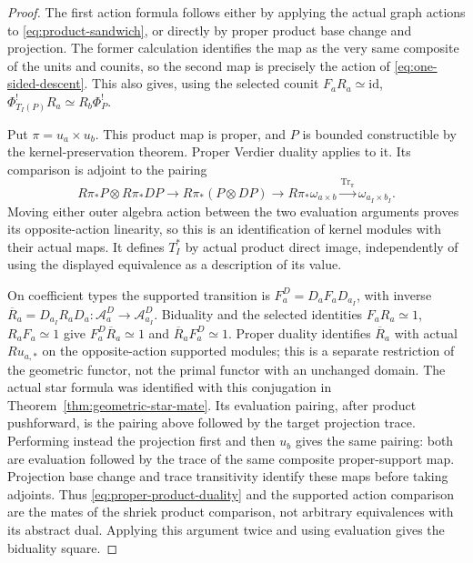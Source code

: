 \documentclass[11pt]{article}
\theoremstyle{definition}
\theoremstyle{remark}
\begin{document}
\begin{proof}
The first action formula follows either by applying the actual graph
actions to \eqref{eq:product-sandwich}, or directly by proper product
base change and projection.  The former calculation identifies the
map as the very same composite of the units and counits, so the second
map is precisely the action of \eqref{eq:one-sided-descent}.
This also gives, using the selected counit $F_aR_a\simeq\mathrm{id}$,
$\Phi_{T_I(P)}^!R_a\simeq R_b\Phi_P^!$.

Put $\pi=u_a\times u_b$.  This product map is proper, and $P$ is
bounded constructible by the
kernel-preservation theorem.  Proper Verdier duality applies to it.
Its comparison is adjoint to the pairing
\[
 R\pi_*P\otimes R\pi_*D P
       \longrightarrow R\pi_*(P\otimes DP)
       \longrightarrow R\pi_*\omega_{a\times b}
       \xrightarrow{\operatorname{Tr}_{\pi}}\omega_{a_I\times b_I}.
\]
Moving either outer algebra action between the two evaluation
arguments proves its opposite-action linearity, so this is an
identification of kernel modules with their actual maps.
It defines $T_I^*$ by actual product direct image, independently of
using the displayed equivalence as a description of its value.

On coefficient types the supported transition is
$F_a^D=D_aF_aD_{a_I}$, with inverse
$\overline R_a=D_{a_I}R_aD_a:\mathcal A_a^D\to\mathcal A_{a_I}^D$.
Biduality and the selected identities $F_aR_a\simeq1$,
$R_aF_a\simeq1$ give $F_a^D\overline R_a\simeq1$ and
$\overline R_aF_a^D\simeq1$.  Proper duality identifies
$\overline R_a$ with actual $Ru_{a,*}$ on the opposite-action
supported modules; this is a separate restriction of the geometric
functor, not the primal functor with an unchanged domain.
The actual star formula was identified with this conjugation in
Theorem~\ref{thm:geometric-star-mate}.  Its evaluation pairing, after
product pushforward, is the pairing above followed by the target
projection trace.  Performing instead the projection first and then
$u_b$ gives the same pairing: both are evaluation followed by the
trace of the same composite proper-support map.  Projection base
change and trace transitivity identify these maps before taking
adjoints.  Thus \eqref{eq:proper-product-duality} and the supported
action comparison are the mates of the shriek product comparison,
not arbitrary equivalences with its abstract dual.  Applying this
argument twice and using evaluation gives the biduality square.


\end{proof}
\end{document}
